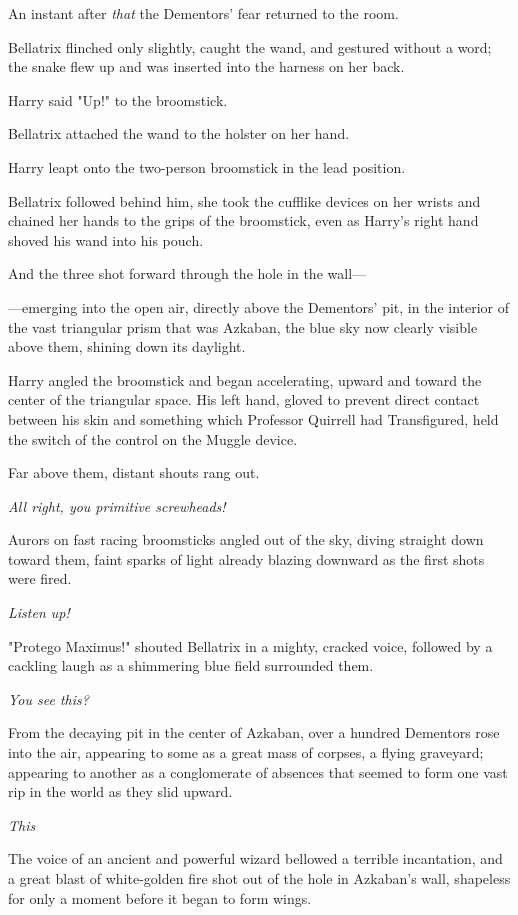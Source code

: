 An instant after \emph{that} the Dementors' fear returned to the room.

Bellatrix flinched only slightly, caught the wand, and gestured without a word;
the snake flew up and was inserted into the harness on her back.

Harry said "Up!" to the broomstick.

Bellatrix attached the wand to the holster on her hand.

Harry leapt onto the two-person broomstick in the lead position.

Bellatrix followed behind him, she took the cufflike devices on her wrists and
chained her hands to the grips of the broomstick, even as Harry's right hand
shoved his wand into his pouch.

And the three shot forward through the hole in the wall---

---emerging into the open air, directly above the Dementors' pit, in the
interior of the vast triangular prism that was Azkaban, the blue sky now
clearly visible above them, shining down its daylight.

Harry angled the broomstick and began accelerating, upward and toward the
center of the triangular space. His left hand, gloved to prevent direct contact
between his skin and something which Professor Quirrell had Transfigured, held
the switch of the control on the Muggle device.

Far above them, distant shouts rang out.

\emph{All right, you primitive screwheads!}

Aurors on fast racing broomsticks angled out of the sky, diving straight down
toward them, faint sparks of light already blazing downward as the first shots
were fired.

\emph{Listen up!}

"Protego Maximus!" shouted Bellatrix in a mighty, cracked voice, followed by a
cackling laugh as a shimmering blue field surrounded them.

\emph{You see this?}

From the decaying pit in the center of Azkaban, over a hundred Dementors rose
into the air, appearing to some as a great mass of corpses, a flying graveyard;
appearing to another as a conglomerate of absences that seemed to form one vast
rip in the world as they slid upward.

\emph{This{\el}}

The voice of an ancient and powerful wizard bellowed a terrible incantation,
and a great blast of white-golden fire shot out of the hole in Azkaban's wall,
shapeless for only a moment before it began to form wings.

